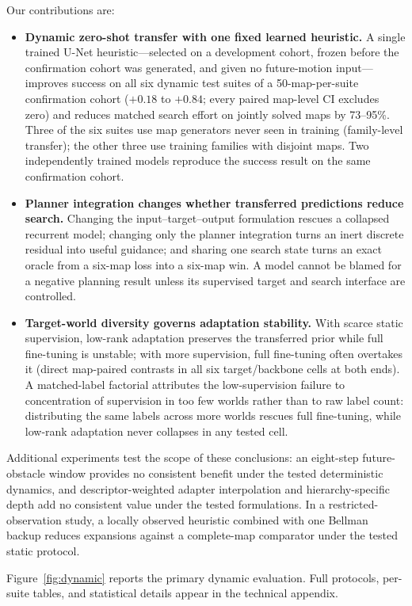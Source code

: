 \documentclass[letterpaper]{article} %
\begin{document}
Our contributions are:
\begin{itemize}
    \item \textbf{Dynamic zero-shot transfer with one fixed learned heuristic.} A single trained U-Net heuristic---selected on a development cohort, frozen before the confirmation cohort was generated, and given no future-motion input---improves success on all six dynamic test suites of a 50-map-per-suite confirmation cohort ($+0.18$ to $+0.84$; every paired map-level CI excludes zero) and reduces matched search effort on jointly solved maps by 73--95\%. Three of the six suites use map generators never seen in training (family-level transfer); the other three use training families with disjoint maps. Two independently trained models reproduce the success result on the same confirmation cohort.
    \item \textbf{Planner integration changes whether transferred predictions reduce search.} Changing the input--target--output formulation rescues a collapsed recurrent model; changing only the planner integration turns an inert discrete residual into useful guidance; and sharing one search state turns an exact oracle from a six-map loss into a six-map win. A model cannot be blamed for a negative planning result unless its supervised target and search interface are controlled.
    \item \textbf{Target-world diversity governs adaptation stability.} With scarce static supervision, low-rank adaptation preserves the transferred prior while full fine-tuning is unstable; with more supervision, full fine-tuning often overtakes it (direct map-paired contrasts in all six target/backbone cells at both ends). A matched-label factorial attributes the low-supervision failure to concentration of supervision in too few worlds rather than to raw label count: distributing the same labels across more worlds rescues full fine-tuning, while low-rank adaptation never collapses in any tested cell.
\end{itemize}
Additional experiments test the scope of these conclusions: an eight-step future-obstacle window provides no consistent benefit under the tested deterministic dynamics, and descriptor-weighted adapter interpolation and hierarchy-specific depth add no consistent value under the tested formulations. In a restricted-observation study, a locally observed heuristic combined with one Bellman backup reduces expansions against a complete-map comparator under the tested static protocol.

Figure~\ref{fig:dynamic} reports the primary dynamic evaluation. Full protocols, per-suite tables, and statistical details appear in the technical appendix.
\end{document}
